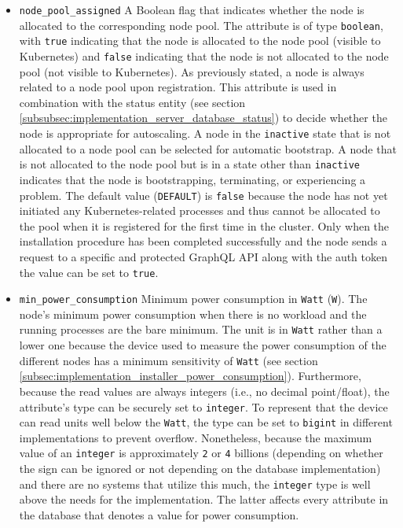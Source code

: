 \begin{itemize}
  \item \texttt{node\_pool\_assigned}
    \newline
    A Boolean flag that indicates whether the node is allocated to the
    corresponding node pool.
    \newline
    The attribute is of type \texttt{boolean}, with \texttt{true} indicating
    that the node is allocated to the node pool (visible to Kubernetes) and
    \texttt{false} indicating that the node is not allocated to the node pool (not
    visible to Kubernetes).
    \newline
    As previously stated, a node is always related to a node pool upon registration.
    This attribute is used in combination with the status entity (see section \ref{subsubsec:implementation_server_database_status})
    to decide whether the node is appropriate for autoscaling. A node in the \texttt{inactive}
    state that is not allocated to a node pool can be selected for automatic
    bootstrap. A node that is not allocated to the node pool but is in a state other
    than \texttt{inactive} indicates that the node is bootstrapping, terminating,
    or experiencing a problem.
    \newline
    The default value (\texttt{DEFAULT}) is \texttt{false} because the node has not
    yet initiated any Kubernetes-related processes and thus cannot be allocated to
    the pool when it is registered for the first time in the cluster. Only when
    the installation procedure has been completed successfully and the node
    sends a request to a specific and protected GraphQL API along with the auth
    token the value can be set to \texttt{true}.

  \item \texttt{min\_power\_consumption}
    \newline
    Minimum power consumption in \texttt{Watt} (\texttt{W}).
    \newline
    The node's minimum power consumption when there is no workload and the running
    processes are the bare minimum.
    \newline
    The unit is in \texttt{Watt} rather than a lower one because the device used
    to measure the power consumption of the different nodes has a minimum sensitivity
    of \texttt{Watt} (see section \ref{subsec:implementation_installer_power_consumption}).
    Furthermore, because the read values are always integers (i.e., no decimal point/float),
    the attribute's type can be securely set to \texttt{integer}. To represent that
    the device can read units well below the \texttt{Watt}, the type can be set to
    \texttt{bigint} in different implementations to prevent overflow. Nonetheless,
    because the maximum value of an \texttt{integer} is approximately \texttt{2}
    or \texttt{4} billions (depending on whether the sign can be ignored or not
    depending on the database implementation) and there are no systems that utilize
    this much, the \texttt{integer} type is well above the needs for the implementation.
    \newline
    The latter affects every attribute in the database that denotes a value for
    power consumption.


\end{itemize}
